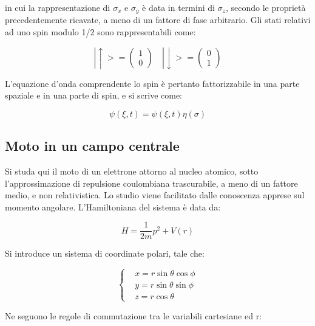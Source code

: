\documentclass{article}
\begin{document}
in cui la rappresentazione di $\sigma_x$ e $\sigma_y$ è data in termini di $\sigma_z$, secondo le proprietà precedentemente ricavate, a meno di 
un fattore di fase arbitrario.
Gli stati relativi ad uno spin modulo 1/2 sono rappresentabili come:

\begin{equation}
    |\uparrow>=\begin{pmatrix}
        1 \\
        0
    \end{pmatrix}
    \quad
    |\downarrow>=\begin{pmatrix}
        0 \\
        1
    \end{pmatrix}
\end{equation}

L'equazione d'onda comprendente lo spin è pertanto fattorizzabile in una parte spaziale e in una parte di spin, e si scrive come:

\begin{equation}
    \psi(\xi, t)=\psi(\xi, t) \eta(\sigma)
\end{equation}

\subsection{Moto in un campo centrale}
Si studa qui il moto di un elettrone attorno al nucleo atomico, sotto l'approssimazione di repulsione coulombiana trascurabile, a meno di un fattore medio, e non relativistica.
Lo studio viene facilitato dalle conoscenza apprese sul momento angolare. 
L'Hamiltoniana del sistema è data da:

\begin{equation}
    H=\frac{1}{2m}p^2+V(r)
\end{equation}

Si introduce un sistema di coordinate polari, tale che:

\begin{equation}
    \left\{
    \begin{aligned}
        & x=r\sin{\theta}\cos{\phi} \\
        & y=r\sin{\theta}\sin{\phi} \\
        & z=r\cos{\theta}
    \end{aligned}
    \right.
\end{equation}

Ne seguono le regole di commutazione tra le variabili cartesiane ed r:
\end{document}
